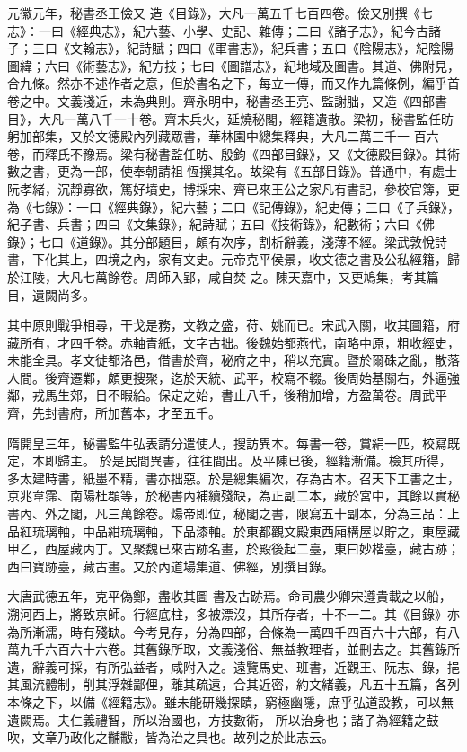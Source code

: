 \begin{pinyinscope}
 元徽元年，秘書丞王儉又
 造《目錄》，大凡一萬五千七百四卷。儉又別撰《七志》：一曰《經典志》，紀六藝、小學、史記、雜傳；二曰《諸子志》，紀今古諸子；三曰《文翰志》，紀詩賦；四曰《軍書志》，紀兵書；五曰《陰陽志》，紀陰陽圖緯；六曰《術藝志》，紀方技；七曰《圖譜志》，紀地域及圖書。其道、佛附見，合九條。然亦不述作者之意，但於書名之下，每立一傳，而又作九篇條例，編乎首卷之中。文義淺近，未為典則。齊永明中，秘書丞王亮、監謝朏，又造《四部書目》，大凡一萬八千一十卷。齊末兵火，延燒秘閣，經籍遺散。梁初，秘書監任昉躬加部集，又於文德殿內列藏眾書，華林園中總集釋典，大凡二萬三千一
 百六卷，而釋氏不豫焉。梁有秘書監任昉、殷鈞《四部目錄》，又《文德殿目錄》。其術數之書，更為一部，使奉朝請祖恆撰其名。故梁有《五部目錄》。普通中，有處士阮孝緒，沉靜寡欲，篤好墳史，博採宋、齊已來王公之家凡有書記，參校官簿，更為《七錄》：一曰《經典錄》，紀六藝；二曰《記傳錄》，紀史傳；三曰《子兵錄》，紀子書、兵書；四曰《文集錄》，紀詩賦；五曰《技術錄》，紀數術；六曰《佛錄》；七曰《道錄》。其分部題目，頗有次序，割析辭義，淺薄不經。梁武敦悅詩書，下化其上，四境之內，家有文史。元帝克平侯景，收文德之書及公私經籍，歸於江陵，大凡七萬餘卷。周師入郢，咸自焚
 之。陳天嘉中，又更鳩集，考其篇目，遺闕尚多。



 其中原則戰爭相尋，干戈是務，文教之盛，苻、姚而已。宋武入關，收其圖籍，府藏所有，才四千卷。赤軸青紙，文字古拙。後魏始都燕代，南略中原，粗收經史，未能全具。孝文徙都洛邑，借書於齊，秘府之中，稍以充實。暨於爾硃之亂，散落人間。後齊遷鄴，頗更搜聚，迄於天統、武平，校寫不輟。後周始基關右，外逼強鄰，戎馬生郊，日不暇給。保定之始，書止八千，後稍加增，方盈萬卷。周武平齊，先封書府，所加舊本，才至五千。



 隋開皇三年，秘書監牛弘表請分遣使人，搜訪異本。每書一卷，賞絹一匹，校寫既定，本即歸主。
 於是民間異書，往往間出。及平陳已後，經籍漸備。檢其所得，多太建時書，紙墨不精，書亦拙惡。於是總集編次，存為古本。召天下工書之士，京兆韋霈、南陽杜頵等，於秘書內補續殘缺，為正副二本，藏於宮中，其餘以實秘書內、外之閣，凡三萬餘卷。煬帝即位，秘閣之書，限寫五十副本，分為三品：上品紅琉璃軸，中品紺琉璃軸，下品漆軸。於東都觀文殿東西廂構屋以貯之，東屋藏甲乙，西屋藏丙丁。又聚魏已來古跡名畫，於殿後起二臺，東曰妙楷臺，藏古跡；西曰寶跡臺，藏古畫。又於內道場集道、佛經，別撰目錄。



 大唐武德五年，克平偽鄭，盡收其圖
 書及古跡焉。命司農少卿宋遵貴載之以船，溯河西上，將致京師。行經底柱，多被漂沒，其所存者，十不一二。其《目錄》亦為所漸濡，時有殘缺。今考見存，分為四部，合條為一萬四千四百六十六部，有八萬九千六百六十六卷。其舊錄所取，文義淺俗、無益教理者，並刪去之。其舊錄所遺，辭義可採，有所弘益者，咸附入之。遠覽馬史、班書，近觀王、阮志、錄，挹其風流體制，削其浮雜鄙俚，離其疏遠，合其近密，約文緒義，凡五十五篇，各列本條之下，以備《經籍志》。雖未能研幾探賾，窮極幽隱，庶乎弘道設教，可以無遺闕焉。夫仁義禮智，所以治國也，方技數術，
 所以治身也；諸子為經籍之鼓吹，文章乃政化之黼黻，皆為治之具也。故列之於此志云。




\end{pinyinscope}
